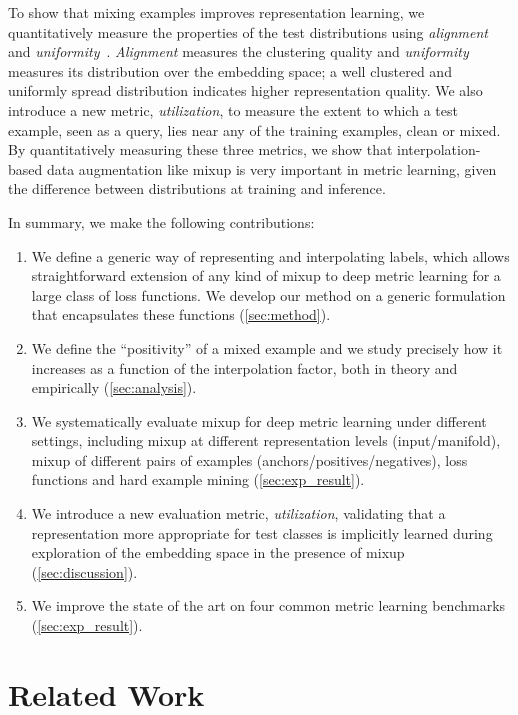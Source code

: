 \documentclass{article}
\begin{document}
To show that mixing examples improves representation learning, we quantitatively measure the properties of the test distributions using \emph{alignment} and \emph{uniformity}~\citep{wang2020understanding}. \emph{Alignment} measures the clustering quality and \emph{uniformity} measures its distribution over the embedding space; a well clustered and uniformly spread distribution indicates higher representation quality. We also introduce a new metric, \emph{utilization}, to measure the extent to which a test example, seen as a query, lies near any of the training examples, clean or mixed. By quantitatively measuring these three metrics, we show that interpolation-based data augmentation like mixup is very important in metric learning, given the difference between distributions at training and inference.


In summary, we make the following contributions:
\begin{enumerate}[itemsep=4pt, parsep=0pt, topsep=0pt,labelwidth=20pt,leftmargin=20pt]
	\item We define a generic way of representing and interpolating labels, which allows straightforward extension of any kind of mixup to deep metric learning for a large class of loss functions. We develop our method on a generic formulation that encapsulates these functions (\autoref{sec:method}).
	\item We define the ``positivity'' of a mixed example and we study precisely how it increases as a function of the interpolation factor, both in theory and empirically (\autoref{sec:analysis}).
	\item We systematically evaluate mixup for deep metric learning under different settings, including mixup at different representation levels (input/manifold), mixup of different pairs of examples (anchors/positives/negatives), loss functions and hard example mining (\autoref{sec:exp_result}).
	\item We introduce a new evaluation metric, \emph{utilization}, validating that a representation more appropriate for test classes is implicitly learned during exploration of the embedding space in the presence of mixup (\autoref{sec:discussion}). 
	\item We improve the state of the art on four common metric learning benchmarks (\autoref{sec:exp_result}).
\end{enumerate} \section{Related Work}
\label{sec:related}
\end{document}
